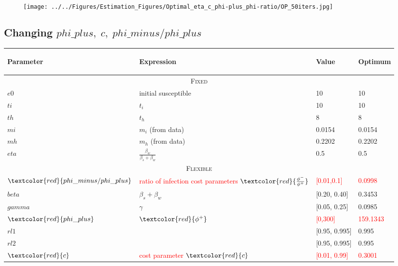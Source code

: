 \documentclass{../cls/NotesV2_Class}
\begin{document}
\begin{figure}[htbp!]
\texttt{[image: ../../Figures/Estimation\_Figures/Optimal\_eta\_c\_phi-plus\_phi-ratio/OP\_50iters.jpg]}
\end{figure}
\newpage
\hline
\subsection{Changing $phi\_plus,\;c,\;phi\_minus/phi\_plus$}
\label{July28Meeting}


\begin{center}
\begin{tabular}[h]{ |p{3cm}||p{6cm}|p{2cm}|p{2cm}|  }
 \hline
 \begin{center}Parameter\end{center} & \begin{center}Expression\end{center} & \begin{center}Value\end{center} & \begin{center}Optimum\end{center} \\
 \hline
 \hline
 \multicolumn{4}{|c|}{\textsc{Fixed}} \\
 \hline
 $e0$   &  initial susceptible  & 10 & 10\\
 $ti$ & $t_i$ & 10 & 10 \\
 $th$ & $t_h$ & 8 & 8\\
 $mi$ & $m_i$ (from data) & 0.0154 & 0.0154 \\
 $mh$ & $m_h$ (from data) & 0.2202 & 0.2202\\
 $eta$ & $\frac{\beta_w}{\beta_s+\beta_w}$ & 0.5 & 0.5 \\
 \hline
 \multicolumn{4}{|c|}{\textsc{Flexible}} \\
 \hline
$\textcolor{red}{phi\_minus/phi\_plus}$ & \textcolor{red}{ratio of infection cost parameters} $\textcolor{red}{\frac{\phi^-}{\phi^+}}$ & \textcolor{red}{[0.01,0.1]} & \textcolor{red}{0.0998} \\
 $beta$ & $\beta_s+\beta_w $ & [0.20, 0.40] & 0.3453\\
 $gamma$ & $\gamma$ & [0.05, 0.25] & 0.0985 \\
 $\textcolor{red}{phi\_plus}$ & $\textcolor{red}{\phi^+}$ & \textcolor{red}{[0,300]} & \textcolor{red}{159.1343}\\
 $rl1$ & & [0.95, 0.995] & 0.995\\
 $rl2$ & & [0.95, 0.995] & 0.995\\
 $\textcolor{red}{c}$ & \textcolor{red}{cost parameter} $\textcolor{red}{c}$ & \textcolor{red}{[0.01, 0.99]} & \textcolor{red}{0.3001}\\
 \hline
\end{tabular}
\end{center}
\end{document}

